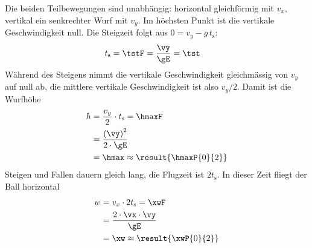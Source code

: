 \begin{center}
\end{center}

Die beiden Teilbewegungen sind unabhängig: horizontal gleichförmig mit $v_x$, vertikal ein senkrechter Wurf mit $v_y$. Im höchsten Punkt ist die vertikale Geschwindigkeit null. Die Steigzeit folgt aus $0 = v_y - g\,t_\text{s}$:
\begin{align}
 t_\text{s} &= \tstF = \frac{\vy}{\gE} = \tst
\end{align}
Während des Steigens nimmt die vertikale Geschwindigkeit gleichmässig von $v_y$ auf null ab, die mittlere vertikale Geschwindigkeit ist also $v_y/2$. Damit ist die Wurfhöhe
\begin{align}
 h &= \frac{v_y}{2}\cdot t_\text{s} = \hmaxF \\
   &= \frac{\left(\vy\right)^2}{2\cdot\gE} \\
   &= \hmax \approx \result{\hmaxP{0}{2}}
\end{align}
Steigen und Fallen dauern gleich lang, die Flugzeit ist $2t_\text{s}$. In dieser Zeit fliegt der Ball horizontal
\begin{align}
 w &= v_x\cdot 2t_\text{s} = \xwF \\
   &= \frac{2\cdot\vx\cdot\vy}{\gE} \\
   &= \xw \approx \result{\xwP{0}{2}}
\end{align}
